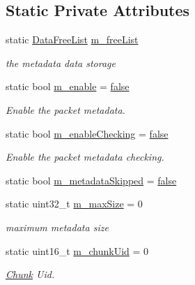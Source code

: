 \subsection*{Static Private Attributes}
\begin{DoxyCompactItemize}
\item 
static \hyperlink{classns3_1_1PacketMetadata_1_1DataFreeList}{Data\+Free\+List} \hyperlink{classns3_1_1PacketMetadata_aa646ed601542eec6bb98e6219165a7c8}{m\+\_\+free\+List}
\begin{DoxyCompactList}\small\item\em the metadata data storage \end{DoxyCompactList}\item 
static bool \hyperlink{classns3_1_1PacketMetadata_a666ea556ffbd8f2226195cde1abe7ae7}{m\+\_\+enable} = \hyperlink{lte__cqi__generation_8m_ab1bef239d413c4da139c4bac92cd657a}{false}
\begin{DoxyCompactList}\small\item\em Enable the packet metadata. \end{DoxyCompactList}\item 
static bool \hyperlink{classns3_1_1PacketMetadata_a3b4333cb8df79817e7ca74de1a090d89}{m\+\_\+enable\+Checking} = \hyperlink{lte__cqi__generation_8m_ab1bef239d413c4da139c4bac92cd657a}{false}
\begin{DoxyCompactList}\small\item\em Enable the packet metadata checking. \end{DoxyCompactList}\item 
static bool \hyperlink{classns3_1_1PacketMetadata_ac370960e8881e5a7280122e9dc5f7ace}{m\+\_\+metadata\+Skipped} = \hyperlink{lte__cqi__generation_8m_ab1bef239d413c4da139c4bac92cd657a}{false}
\item 
static uint32\+\_\+t \hyperlink{classns3_1_1PacketMetadata_a3816d0a0ab763831fd248b0b2693db1c}{m\+\_\+max\+Size} = 0
\begin{DoxyCompactList}\small\item\em maximum metadata size \end{DoxyCompactList}\item 
static uint16\+\_\+t \hyperlink{classns3_1_1PacketMetadata_a98e20e3da84be30e3ff4b1761f215cbd}{m\+\_\+chunk\+Uid} = 0
\begin{DoxyCompactList}\small\item\em \hyperlink{classns3_1_1Chunk}{Chunk} Uid. \end{DoxyCompactList}\end{DoxyCompactItemize}
